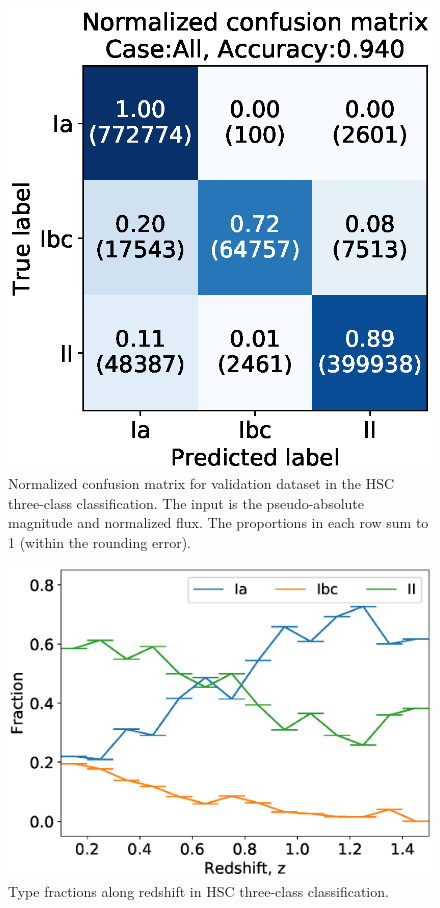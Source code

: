 \documentclass[proof]{pasj01}
\begin{document}
%
%
\begin{figure}[htbp]
  \begin{center}
     \includegraphics[width=\columnwidth]{figures/13_CM_abs-mag_scaled-flux_w-mixup_remove-y_predictions_validation_2_Flagall_weighted.eps}
  \end{center}
  \caption{%
  Normalized confusion matrix for validation dataset in the HSC three-class classification.
  The input is the pseudo-absolute magnitude and normalized flux.
  The proportions in each row sum to 1 (within the rounding error).
  }%
  \label{fig:h3_validation_CM}
\end{figure}
%
%
%
\begin{figure}[htbp]
  \begin{center}
     \includegraphics[width=\columnwidth]{figures/SNfrac_alongz.eps}
  \end{center}
  \caption{%
  Type fractions along redshift in HSC three-class classification.
  }%
  \label{fig:hsc3_type_frac_alongz}
\end{figure}
%
\end{document}
